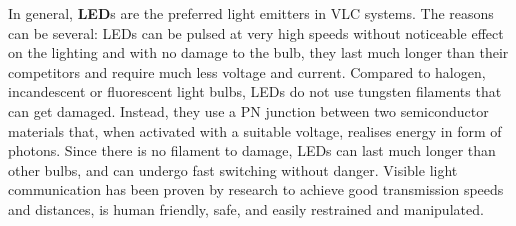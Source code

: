 In general, \textbf{LED}s are the preferred light emitters in VLC systems.
The reasons can be several: LEDs can be pulsed at very high speeds without noticeable effect on the lighting and with no damage to the bulb, they last much longer than their competitors and require much less voltage and current.
Compared to halogen, incandescent or fluorescent light bulbs, LEDs do not use tungsten filaments that can get damaged.
Instead, they use a PN junction between two semiconductor materials that, when activated with a suitable voltage, realises energy in form of photons.
Since there is no filament to damage, LEDs can last much longer than other bulbs, and can undergo fast switching without danger.
Visible light communication has been proven by research to achieve good transmission speeds and distances, is human friendly, safe, and easily restrained and manipulated. 
 
